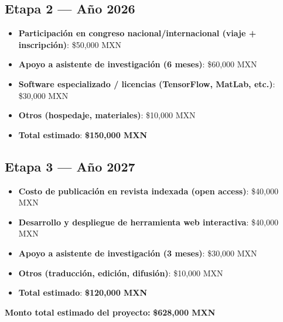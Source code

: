 \documentclass[12pt]{article}
\begin{document}
\subsection*{Etapa 2 — Año 2026}
\begin{itemize}
  \item \textbf{Participación en congreso nacional/internacional (viaje + inscripción)}: \$50,000 MXN
  \item \textbf{Apoyo a asistente de investigación (6 meses)}: \$60,000 MXN
  \item \textbf{Software especializado / licencias (TensorFlow, MatLab, etc.)}: \$30,000 MXN
  \item \textbf{Otros (hospedaje, materiales)}: \$10,000 MXN
  \item \textbf{Total estimado}: \textbf{\$150,000 MXN}
\end{itemize}

\subsection*{Etapa 3 — Año 2027}
\begin{itemize}
  \item \textbf{Costo de publicación en revista indexada (open access)}: \$40,000 MXN
  \item \textbf{Desarrollo y despliegue de herramienta web interactiva}: \$40,000 MXN
  \item \textbf{Apoyo a asistente de investigación (3 meses)}: \$30,000 MXN
  \item \textbf{Otros (traducción, edición, difusión)}: \$10,000 MXN
  \item \textbf{Total estimado}: \textbf{\$120,000 MXN}
\end{itemize}

\textbf{Monto total estimado del proyecto:} \textbf{\$628,000 MXN}
\end{document}
